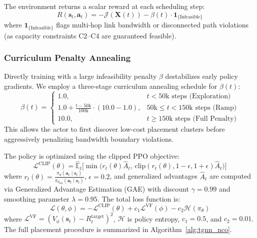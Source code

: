 \documentclass[conference]{IEEEtran}
\begin{document}
The environment returns a scalar reward at each scheduling step:
\begin{equation}
R(\mathbf{s}_t, \mathbf{a}_t) = -\mathcal{J}(\mathbf{X}(t)) - \beta(t) \cdot \mathbf{1}_{\{\text{Infeasible}\}}
\end{equation}
where $\mathbf{1}_{\{\text{Infeasible}\}}$ flags multi-hop link bandwidth or disconnected path violations (as capacity constraints C2--C4 are guaranteed feasible).

\subsubsection{Curriculum Penalty Annealing}
Directly training with a large infeasibility penalty $\beta$ destabilizes early policy gradients. We employ a three-stage curriculum annealing schedule for $\beta(t)$:
\begin{equation}
\beta(t) = \begin{cases}
1.0, & t < 50\text{k steps (Exploration)} \\
1.0 + \frac{t - 50\text{k}}{100\text{k}} \cdot (10.0 - 1.0), & 50\text{k} \le t < 150\text{k steps (Ramp)} \\
10.0, & t \ge 150\text{k steps (Full Penalty)}
\end{cases}
\end{equation}
This allows the actor to first discover low-cost placement clusters before aggressively penalizing bandwidth boundary violations.

The policy is optimized using the clipped PPO objective:
\begin{equation}
\mathcal{L}^{\text{CLIP}}(\theta) = \hat{\mathbb{E}}_t \big[ \min\big(r_t(\theta)\hat{A}_t, \, \text{clip}(r_t(\theta), 1-\epsilon, 1+\epsilon)\hat{A}_t\big) \big]
\end{equation}
where $r_t(\theta) = \frac{\pi_\theta(\mathbf{a}_t \mid \mathbf{s}_t)}{\pi_{\theta_{\text{old}}}(\mathbf{a}_t \mid \mathbf{s}_t)}$, $\epsilon = 0.2$, and generalized advantages $\hat{A}_t$ are computed via Generalized Advantage Estimation (GAE) with discount $\gamma = 0.99$ and smoothing parameter $\lambda = 0.95$. The total loss function is:
\begin{equation}
\mathcal{L}(\theta, \phi) = -\mathcal{L}^{\text{CLIP}}(\theta) + c_1 \mathcal{L}^{\text{VF}}(\phi) - c_2 \mathcal{H}(\pi_\theta)
\end{equation}
where $\mathcal{L}^{\text{VF}} = (V_\phi(\mathbf{s}_t) - R_t^{\text{target}})^2$, $\mathcal{H}$ is policy entropy, $c_1 = 0.5$, and $c_2 = 0.01$. The full placement procedure is summarized in Algorithm~\ref{alg:tgnn_nco}.
\end{document}
